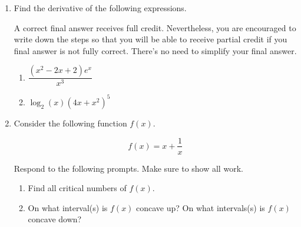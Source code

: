 \documentclass[11pt]{article}
\begin{document}
\begin{enumerate}
\begin{center}
\end{center}



\newpage


\item Find the derivative of the following expressions. 

A correct final answer receives full credit. Nevertheless, you are encouraged to write down the steps so that you will be able to receive partial credit if you final answer is not fully correct. There's no need to simplify your final answer.

\begin{enumerate}
\item $\dfrac{(x^2 - 2x +2)e^x}{x^3}$

\vfill

\item $\log_{2}(x)\left(4x+x^2\right)^5$

\vfill 
\end{enumerate}



\newpage


\item Consider the following function $f(x)$.

\[f(x)=x + \frac{1}{x}\]

Respond to the following prompts. Make sure to show all work.

\begin{enumerate}
    \item Find all critical numbers of $f(x)$.

    \vspace{6cm}

    \item On what interval(s) is $f(x)$ concave up? On what intervals(s) is $f(x)$ concave down?


\end{enumerate}
\end{enumerate}
\end{document}
